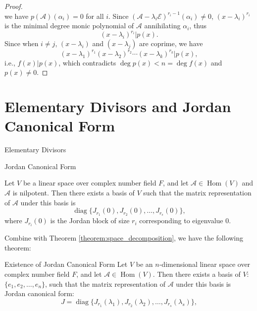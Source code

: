 \documentclass[11pt]{../../TexTemplate/elegantbook} %
\begin{document}
\begin{proof}
\[\]
we have \(p(\mathcal{A})(\alpha_{i}) = 0\) for all \(i\).
\newline Since \((\mathcal{A} - \lambda_i \mathcal{E})^{r_i - 1}(\alpha_{i}) \neq 0\),
\((x - \lambda_i)^{r_i}\) is the minimal degree monic polynomial of \(\mathcal{A}\) annihilating \(\alpha_{i}\),
thus 
\[
(x - \lambda_i)^{r_i} | p(x).
\] 
Since when \(i\neq j\), \((x - \lambda_i)\) and \((x - \lambda_j)\) are coprime,
we have
\[
(x - \lambda_1)^{r_1} (x - \lambda_2)^{r_2} \cdots (x - \lambda_k)^{r_k} | p(x),
\]
i.e., \( f(x) | p(x) \),
which contradicts \(\operatorname{deg} p(x) <  n = \deg f(x)\) and \(p(x)\neq 0\).
\end{proof}


\section{Elementary Divisors and Jordan Canonical Form}
\begin{leftbarTitle}{Elementary Divisors}\end{leftbarTitle}

\begin{leftbarTitle}{Jordan Canonical Form}\end{leftbarTitle}


\begin{lemma}\label{lemma:nilpotent_jordan_form}
    Let \( V \) be a linear space over complex number field \( F \), 
    and let \( \mathcal{A}\in \operatorname{Hom}(V) \) and \(\mathcal{A}\) is nilpotent.
    Then there exists a basis of \( V \) such that 
    the matrix representation of \( \mathcal{A} \) under this basis is
    \[
    \operatorname{diag}\{ J_{r_{1}}(0), J_{r_{2}}(0), \ldots, J_{r_{s}}(0) \},
    \]
    where \( J_{r_{i}}(0) \) is the Jordan block of size \( r_i \) corresponding to eigenvalue \( 0 \).
\end{lemma}
Combine with Theorem \ref{theorem:space_decomposition}, we have the following theorem:
\begin{theorem}{Existence of Jordan Canonical Form}
    Let \( V \) be an \( n \)-dimensional linear space over complex number field \( F \),
    and let \( \mathcal{A}\in \operatorname{Hom}(V) \).
    Then there exists a basis of \( V \): \(\{ e_{1}, e_{2}, \ldots, e_{n} \}\),
    such that the matrix representation of \( \mathcal{A} \) under this basis is Jordan canonical form:
    \[
    J = \operatorname{diag}\{ J_{r_{1}}(\lambda_{1}), J_{r_{2}}(\lambda_{2}), \ldots, J_{r_{s}}(\lambda_{s}) \},
    \]
\end{theorem}
\end{document}
